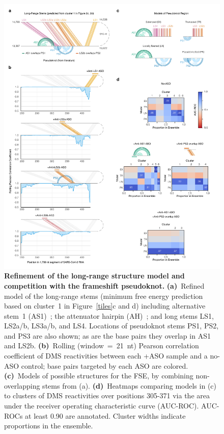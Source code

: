 \documentclass[main.tex]{subfiles}
\begin{document}
\begin{figure}[H]
	\includegraphics[width=\textwidth]{../MainFigures/lnas/lnas.pdf}
	\caption{\textbf{Refinement of the long-range structure model and competition with the frameshift pseudoknot.} \textbf{(a)}~Refined model of the long-range stems (minimum free energy prediction based on cluster~1 in Figure~\ref{tiles}c and d) including alternative stem~1 (AS1)~\cite{Lan2022}; the attenuator hairpin (AH)~\cite{Su2005}; and long stems LS1, LS2a/b, LS3a/b, and LS4. Locations of pseudoknot stems PS1, PS2, and PS3 are also shown; as are the base pairs they overlap in AS1 and LS2b. \textbf{(b)}~Rolling (window~=~21~nt) Pearson correlation coefficient of DMS reactivities between each +ASO sample and a no-ASO control; base pairs targeted by each ASO are colored. \textbf{(c)}~Models of possible structures for the FSE, by combining non-overlapping stems from (a). \textbf{(d)}~Heatmaps comparing models in (c) to clusters of DMS reactivities over positions 305-371 via the area under the receiver operating characteristic curve (AUC-ROC). AUC-ROCs at least 0.90 are annotated. Cluster widths indicate proportions in the ensemble.}
	\label{lnas}
\end{figure}
\end{document}
